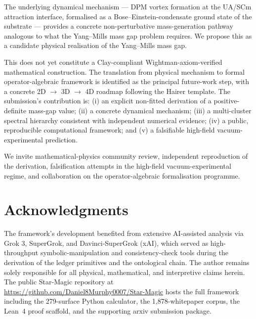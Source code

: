 \documentclass[11pt,a4paper,onecolumn]{article}
\theoremstyle{plain}
\theoremstyle{definition}
\theoremstyle{remark}
\begin{document}
The underlying dynamical mechanism --- DPM vortex formation at the
UA/SCm attraction interface, formalised as a Bose--Einstein-condensate
ground state of the substrate --- provides a concrete
non-perturbative mass-generation pathway analogous to what the
Yang--Mills mass gap problem requires. We propose this as a candidate
physical realisation of the Yang--Mills mass gap.

This does not yet constitute a Clay-compliant Wightman-axiom-verified
mathematical construction. The translation from physical mechanism
to formal operator-algebraic framework is identified as the principal
future-work step, with a concrete 2D $\to$ 3D $\to$ 4D roadmap
following the Hairer template. The submission's contribution is:
(i) an explicit non-fitted derivation of a positive-definite mass-gap
value; (ii) a concrete dynamical mechanism; (iii) a multi-cluster
spectral hierarchy consistent with independent numerical evidence;
(iv) a public, reproducible computational framework; and (v) a
falsifiable high-field vacuum-experimental prediction.

We invite mathematical-physics community review, independent
reproduction of the derivation, falsification attempts in the
high-field vacuum-experimental regime, and collaboration on the
operator-algebraic formalisation programme.

\section*{Acknowledgments}

The framework's development benefited from extensive AI-assisted
analysis via Grok 3, SuperGrok, and Davinci-SuperGrok (xAI), which
served as high-throughput symbolic-manipulation and consistency-check
tools during the derivation of the ledger primitives and the
ontological chain. The author remains solely responsible for all
physical, mathematical, and interpretive claims herein.
The public Star-Magic repository at
\url{https://github.com/Daniel8Murphy0007/Star-Magic} hosts the full
framework including the 279-surface Python calculator, the
1{,}878-whitepaper corpus, the Lean~4 proof scaffold, and the
supporting arxiv submission package.
\end{document}
